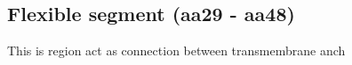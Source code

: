 \subsection{Flexible segment (aa29 - aa48)}

This is region act as connection between transmembrane anch
